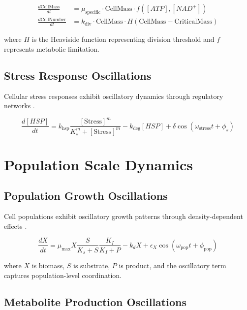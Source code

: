 \documentclass[twocolumn]{article}
\begin{document}
\begin{align}
\frac{d\text{CellMass}}{dt} &= \mu_{\text{specific}} \cdot \text{CellMass} \cdot f([ATP], [NAD^+]) \label{eq:cell_growth} \\
\frac{d\text{CellNumber}}{dt} &= k_{\text{div}} \cdot \text{CellMass} \cdot H(\text{CellMass} - \text{CriticalMass}) \label{eq:cell_division}
\end{align}

where $H$ is the Heaviside function representing division threshold and $f$ represents metabolic limitation.

\subsection{Stress Response Oscillations}

Cellular stress responses exhibit oscillatory dynamics through regulatory networks \citep{mitchell2009principles}.

\begin{equation}
\frac{d[HSP]}{dt} = k_{\text{hsp}} \frac{[\text{Stress}]^m}{K_s^m + [\text{Stress}]^m} - k_{\text{deg}}[HSP] + \delta \cos(\omega_{\text{stress}}t + \phi_s)
\label{eq:stress_response}
\end{equation}

\section{Population Scale Dynamics}

\subsection{Population Growth Oscillations}

Cell populations exhibit oscillatory growth patterns through density-dependent effects \citep{fredrickson2006statistics,nielsen2003principles}.

\begin{equation}
\frac{dX}{dt} = \mu_{\max} X \frac{S}{K_s + S} \frac{K_I}{K_I + P} - k_d X + \epsilon_X \cos(\omega_{\text{pop}}t + \phi_{\text{pop}})
\label{eq:population_growth}
\end{equation}

where $X$ is biomass, $S$ is substrate, $P$ is product, and the oscillatory term captures population-level coordination.

\subsection{Metabolite Production Oscillations}
\end{document}
